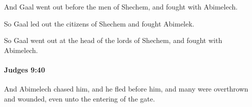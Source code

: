 			\begin{versebox}
					\item[BHS] 
					\item[ASV] And Gaal went out before the men of Shechem, and fought with Abimelech.
					\item[NIV] So Gaal led out the citizens of Shechem and fought Abimelek.
					\item[NRSV] So Gaal went out at the head of the lords of Shechem, and fought with Abimelech.
			\end{versebox}

		\paragraph{Judges 9:40} %
			\label{JUDGES-9-40}

			And Abimelech chased him, and he fled before him, and many were overthrown and wounded, even unto the entering of the gate.

